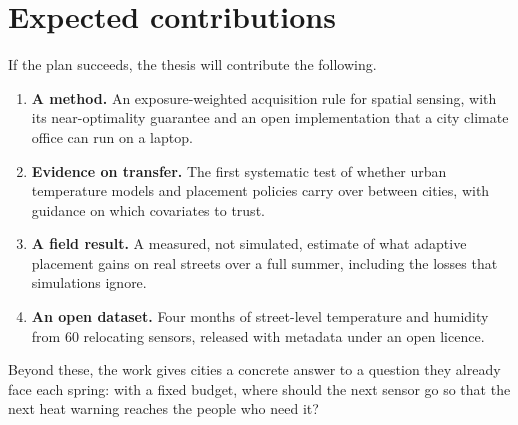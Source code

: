 \chapter{Expected contributions}\label{ch:contrib}

If the plan succeeds, the thesis will contribute the following.

\begin{enumerate}[label=C\arabic*, font=\sffamily\color{accent}, leftmargin=2.2em,
  itemsep=.5em]
\item \textbf{A method.} An exposure-weighted acquisition rule for
  spatial sensing, with its near-optimality guarantee and an open
  implementation that a city climate office can run on a laptop.
\item \textbf{Evidence on transfer.} The first systematic test of
  whether urban temperature models and placement policies carry over
  between cities, with guidance on which covariates to trust.
\item \textbf{A field result.} A measured, not simulated, estimate of
  what adaptive placement gains on real streets over a full summer,
  including the losses that simulations ignore.
\item \textbf{An open dataset.} Four months of street-level temperature
  and humidity from 60 relocating sensors, released with metadata under
  an open licence.
\end{enumerate}

Beyond these, the work gives cities a concrete answer to a question
they already face each spring: with a fixed budget, where should the
next sensor go so that the next heat warning reaches the people who
need it?
